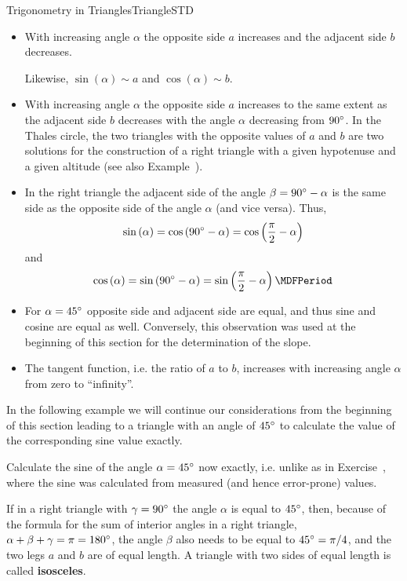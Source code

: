 \begin{MXContent}{Trigonometry in Triangles}{Triangle}{STD}
\begin{itemize}
\item With increasing angle $\alpha$ the opposite side $a$ increases and 
the adjacent side $b$ decreases.

Likewise, $\sin\left(\alpha\right)\sim a$ and 
$\cos\left(\alpha\right)\sim b$.

\item With increasing angle $\alpha$ the opposite side $a$ increases 
to the same extent as the adjacent side $b$ decreases with the angle $\alpha$
decreasing from $90^{\circ}$. In the Thales circle, the two triangles 
with the opposite values of $a$ and $b$ are two solutions for 
the construction of a right triangle with a given hypotenuse and a given 
altitude (see also Example~).

\item In the right triangle the adjacent side of the angle $\beta = 90^{\circ} - \alpha$ is 
the same side as the opposite side of the angle $\alpha$
(and vice versa). Thus, 
\[
\sin\left(\alpha\right)=\cos\left(90\MGrad-\alpha\right) %
 = \cos\left(\frac{\pi}{2}-\alpha\right) %
\]
and 
\[
\cos\left(\alpha\right) = \sin\left(90\MGrad-\alpha\right) %
 = \sin\left(\frac{\pi}{2}-\alpha\right) \MDFPeriod %
\]
%
\item For $\alpha=45^{\circ}$ opposite side and adjacent side are equal, and thus sine and 
cosine are equal as well. Conversely, this observation was used at the beginning of this 
section for the determination of the slope.

\item The tangent function, i.e. the ratio of $a$ to $b$, increases with increasing 
angle $\alpha$ from zero to ``infinity''. 
\end{itemize}

In the following example we will continue our considerations from the beginning of this 
section leading to a triangle with an angle of $45^{\circ}$ to calculate the value 
of the corresponding sine value exactly.

\begin{MExample}
Calculate the sine of the angle $\alpha=45^{\circ}$ now exactly, i.e. unlike as in 
Exercise~, where the sine was calculated from 
measured (and hence error-prone) values.

If in a right triangle with $\gamma=90^{\circ}$ the angle $\alpha$ is equal to $45^{\circ}$, then, 
because of the formula for the sum of interior angles in a right triangle, $\alpha+\beta+\gamma=\pi=180^{\circ}$,  
the angle $\beta$ also needs to be equal to $45^{\circ}=\pi/4$, and the two legs $a$ and $b$ are 
of equal length. A triangle with two sides of equal length is called \textbf{isosceles}.


\end{MExample}
\end{MXContent}
